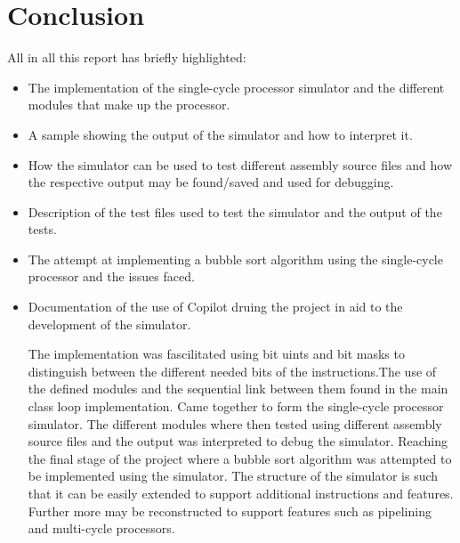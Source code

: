 \documentclass{article}
\begin{document}
\section{Conclusion}
All in all this report has briefly highlighted:
\begin{itemize}
    \item The implementation of the single-cycle processor simulator and the different modules that make up the processor. 
    \item A sample showing the output of the simulator and how to interpret it.
    \item How the simulator can be used to test different assembly source files and how the respective output may be found/saved and used for debugging.
    \item Description of the test files used to test the simulator and the output of the tests.
    \item The attempt at implementing a bubble sort algorithm using the single-cycle processor and the issues faced.
    \item Documentation of the use of Copilot druing the project in aid to the development of the simulator.\\
    \pagebreak

    The implementation was fascilitated using bit uints and bit masks to distinguish between the different needed bits of the instructions.The use of the defined modules and the sequential link between them found in the main class loop implementation. Came together to form the single-cycle processor simulator. The different modules where then tested using different assembly source files and the output was interpreted to debug the simulator. Reaching the final stage of the project where a bubble sort algorithm was attempted to be implemented using the simulator. The structure of the simulator is such that it can be easily extended to support additional instructions and features. Further more may be reconstructed to support features such as pipelining and multi-cycle processors.\\
    \pagebreak

\end{itemize}
\end{document}
